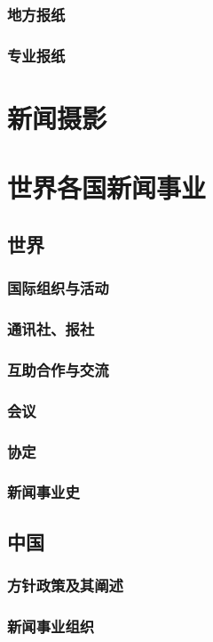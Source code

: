 \documentclass[UTF8]{../../ApplicationUniverse}
\begin{document}
    \subsubsection{地方报纸}
    \subsubsection{专业报纸}
\section{新闻摄影}
\section{世界各国新闻事业}
    \subsection{世界}
        \subsubsection{国际组织与活动}
        \subsubsection{通讯社、报社}
        \subsubsection{互助合作与交流}
        \subsubsection{会议}
        \subsubsection{协定}
        \subsubsection{新闻事业史}
    \subsection{中国}
        \subsubsection{方针政策及其阐述}
        \subsubsection{新闻事业组织}
\end{document}
